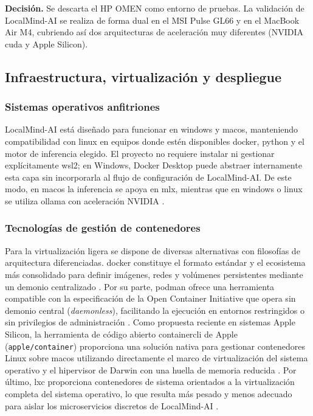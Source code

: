 \textbf{Decisión.} Se descarta el HP OMEN como entorno de pruebas. La validación de LocalMind-AI se realiza de forma dual en el MSI Pulse GL66 y en el MacBook Air M4, cubriendo así dos arquitecturas de aceleración muy diferentes (NVIDIA \gls{cuda} y Apple Silicon).

\subsection{Infraestructura, virtualización y despliegue}\label{subsec:contenedores-localmind}

\subsubsection{Sistemas operativos anfitriones}

LocalMind-AI está diseñado para funcionar en \gls{windows} y \gls{macos}, manteniendo compatibilidad con \gls{linux} en equipos donde estén disponibles \gls{docker}, \gls{python} y el motor de inferencia elegido. El proyecto no requiere instalar ni gestionar explícitamente \gls{wsl2}; en Windows, Docker Desktop puede abstraer internamente esta capa sin incorporarla al flujo de configuración de LocalMind-AI. De este modo, en \gls{macos} la inferencia se apoya en \gls{mlx}, mientras que en \gls{windows} o \gls{linux} se utiliza \gls{ollama} con aceleración NVIDIA \cite{ollama2024,omlx2026}.

\subsubsection{Tecnologías de gestión de contenedores}

Para la virtualización ligera se dispone de diversas alternativas con filosofías de arquitectura diferenciadas. \Gls{docker} constituye el formato estándar y el ecosistema más consolidado para definir imágenes, redes y volúmenes persistentes mediante un demonio centralizado \cite{DockerAcceleratedContainer2022}. Por su parte, \Gls{podman} ofrece una herramienta compatible con la especificación de la Open Container Initiative que opera sin demonio central (\emph{daemonless}), facilitando la ejecución en entornos restringidos o sin privilegios de administración \cite{podman2026}. Como propuesta reciente en sistemas Apple Silicon, la herramienta de código abierto \gls{containercli} de Apple (\texttt{apple/container}) proporciona una solución nativa para gestionar contenedores Linux sobre \gls{macos} utilizando directamente el marco de virtualización del sistema operativo y el hipervisor de Darwin con una huella de memoria reducida \cite{applecontainer2026}. Por último, \Gls{lxc} proporciona contenedores de sistema orientados a la virtualización completa del sistema operativo, lo que resulta más pesado y menos adecuado para aislar los microservicios discretos de LocalMind-AI \cite{lxc2026}.

